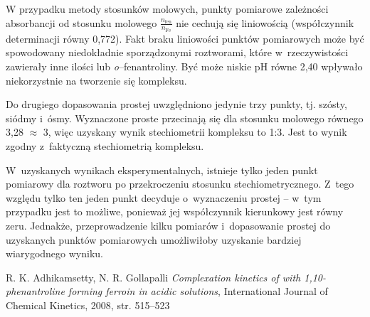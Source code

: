 \documentclass[12pt]{article}
\begin{document}
W przypadku metody stosunków molowych, punkty pomiarowe zależności absorbancji od stosunku molowego $\frac{n_{\mathrm{fen}}}{n_{\mathrm{Fe}}}$ nie cechują się liniowością (współczynnik determinacji równy 0,772). Fakt braku liniowości punktów pomiarowych może być spowodowany niedokładnie sporządzonymi roztworami, które w~rzeczywistości zawierały inne ilości  lub \textit{o}--fenantroliny. Być może niskie pH równe 2,40 wpływało niekorzystnie na tworzenie się kompleksu.

Do drugiego dopasowania prostej uwzględniono jedynie trzy punkty, tj. szósty, siódmy i~ósmy. Wyznaczone proste przecinają się dla stosunku molowego równego 3,28 $\approx$ 3, więc uzyskany wynik stechiometrii kompleksu to 1:3. Jest to wynik zgodny z~faktyczną stechiometrią kompleksu.

W~uzyskanych wynikach eksperymentalnych, istnieje tylko jeden punkt pomiarowy dla roztworu po przekroczeniu stosunku stechiometrycznego. Z~tego względu tylko ten jeden punkt decyduje o~wyznaczeniu prostej -- w~tym przypadku jest to możliwe, ponieważ jej współczynnik kierunkowy jest równy zeru. Jednakże, przeprowadzenie kilku pomiarów i~dopasowanie prostej do uzyskanych punktów pomiarowych umożliwiłoby uzyskanie bardziej wiarygodnego wyniku.

\begin{thebibliography}{9}
R. K. Adhikamsetty, N. R. Gollapalli \emph{Complexation kinetics of  with 1,10-phenantroline forming ferroin in acidic solutions}, International Journal of Chemical Kinetics, 2008, str. 515--523
\end{thebibliography}
\end{document}
